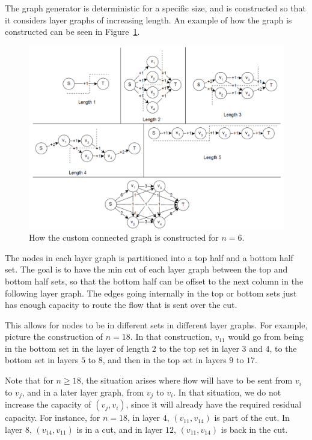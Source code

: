 The graph generator is deterministic for a specific size, and is constructed so that it considers layer graphs of increasing length. An example of how the graph is constructed can be seen in Figure~\ref{badDinicExample}.

\begin{figure}[!ht]
\centering
\includegraphics[width=120mm]{BadDinicExample.png}
\caption{How the custom connected graph is constructed for $n=6$.}
\label{badDinicExample}
\end{figure}

The nodes in each layer graph is partitioned into a top half and a bottom half set. The goal is to have the min cut of each layer graph between the top and bottom half sets, so that the bottom half can be offset to the next column in the following layer graph.
The edges going internally in the top or bottom sets just has enough capacity to route the flow that is sent over the cut. 

This allows for nodes to be in different sets in different layer graphs. For example, picture the construction of $n=18$. 
In that construction, $v_{11}$ would go from being in the bottom set in the layer of length $2$ to the top set in layer $3$ and $4$, to the bottom set in layers $5$ to $8$, and then in the top set in layers $9$ to $17$.

Note that for $n \geq 18$, the situation arises where flow will have to be sent from $v_i$ to $v_j$, and in a later layer graph, from $v_j$ to $v_i$.
In that situation, we do not increase the capacity of $(v_j, v_i)$, since it will already have the required residual capacity.
For instance, for $n=18$, in layer $4$, $(v_{11}, v_{14})$ is part of the cut. In layer $8$, $(v_{14}, v_{11})$ is in a cut, and in layer $12$, $(v_{11}, v_{14})$ is back in the cut.

